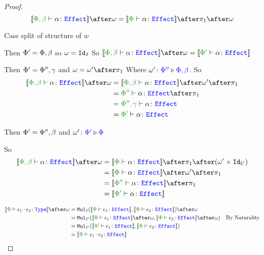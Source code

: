 \documentclass{report}
\begin{document}
\begin{framed}
\begin{proof}
        \case{\eweaken}
        \begin{equation}
            \deno{\typerelation{\P,\b}{\a}{\effect}}\after\w = \deno{\typerelation{\P}{\a}{\effect}}\after\p\after\w
        \end{equation}
        
        Case split of structure of $w$
        
        \subcase{$\w=\i$}
        Then $\Phi' = \Phi,\beta$ so $\omega=\texttt{Id}_{I}$
        So $\deno{\typerelation{\P,\b}{\a}{\effect}}\after\w = \deno{\typerelation{\P'}{\a}{\effect}}$
        
        Then $\Phi' = \Phi'',\gamma$ and $\w=\w'\after\p$
        Where $\omega' \colon {\color{blue}\Phi''} \triangleright {\color {blue} \Phi,\beta}$.
        So
        \begin{align*}
            \deno{\typerelation{\P,\b}{\a}{\effect}}\after\w & = \deno{\typerelation{\P,\b}{\a}{\effect}}\after\w'\after\p\\
            & = {\typerelation{\P''}{\a}{\effect}}\after\p\\
            & = {\typerelation{\P'',\g}{\a}{\effect}}\\
            & = {\typerelation{\P'}{\a}{\effect}}\\
        \end{align*}
        
        Then $\Phi'=\Phi'',\beta$ and $\omega' \colon {\color{blue}\Phi'} \triangleright {\color {blue} \Phi}$
        
        So \begin{align*}
            \deno{\typerelation{\P,\b}{\a}{\effect}}\after\w &= \deno{\typerelation{\P}{\a}{\effect}}\after\p\after(\w'\times\Id{U})\\
            &=\deno{\typerelation{\P}{\a}{\effect}}\after\w'\after\p\\
            & = \deno{\typerelation{\P''}{\a}{\effect}}\after\p\\
            & = \deno{\typerelation{\P'}{\a}{\effect}}\\
        \end{align*}
        
        \case{\ecompose}
        \begin{align*}
            \deno{\typerelation{\P}{\e_1\dot\e_2}{\type}} \after\w &=
            \Mul_I(\deno{\typerelation{\P}{\e_1}{\effect}}, \deno{\typerelation{\P}{\e_2}{\effect}})\after \w \\
            & = \Mul_{I'}(\deno{\typerelation{\P}{\e_1}{\effect}}\after \w, \deno{\typerelation{\P}{\e_2}{\effect}}\after \w)\qt{By Naturality}\\
            & = \Mul_{I'}(\deno{\typerelation{\P'}{\e_1}{\effect}}, \deno{\typerelation{\P}{\e_2}{\effect}})\\
            & = \deno{\typerelation{\P}{\e_1\dot\e_2}{\effect}}
        \end{align*}
    \end{proof}
    
\end{framed}
\end{document}

